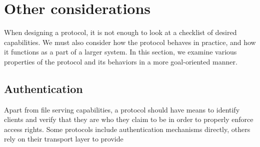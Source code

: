 
\section{Other considerations}

When designing a protocol, it is not enough to look at a checklist of desired capabilities. We must also
consider how the protocol behaves in practice, and how it functions as a part of a larger system. In this
section, we examine various properties of the protocol and its behaviors in a more goal-oriented manner.

\subsection{Authentication}

Apart from file serving capabilities, a protocol should have means to identify clients and verify that they
are who they claim to be in order to properly enforce access rights.  Some protocols include authentication
mechanisms directly, others rely on their transport layer to provide
